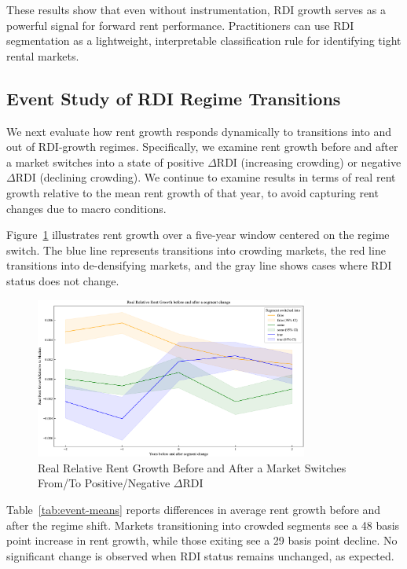 \documentclass[APA,Times1COL]{WileyNJDv5} %
\begin{document}
These results show that even without instrumentation, RDI growth serves as a powerful signal for forward rent performance. Practitioners can use RDI segmentation as a lightweight, interpretable classification rule for identifying tight rental markets.

\subsection{Event Study of RDI Regime Transitions}
We next evaluate how rent growth responds dynamically to transitions into and out of RDI-growth regimes. Specifically, we examine rent growth before and after a market switches into a state of positive  $\Delta$RDI (increasing crowding) or  negative  $\Delta$RDI (declining crowding). We continue to examine results in terms of real rent growth relative to the mean rent growth of that year, to avoid capturing rent changes due to macro conditions.

Figure~\ref{fig:event-study} illustrates rent growth over a five-year window centered on the regime switch. The blue line represents transitions into crowding markets, the red line transitions into de-densifying markets, and the gray line shows cases where RDI status does not change.

\begin{figure}[h]
	\centering
	\includegraphics[width=0.8\textwidth]{event_study.pdf}
	\caption{Real Relative Rent Growth Before and After a Market Switches From/To Positive/Negative $\Delta$RDI}
	\label{fig:event-study}
\end{figure}

Table~\ref{tab:event-means} reports differences in average rent growth before and after the regime shift. Markets transitioning into crowded segments see a 48 basis point increase in rent growth, while those exiting see a 29 basis point decline. No significant change is observed when RDI status remains unchanged, as expected.
\end{document}
